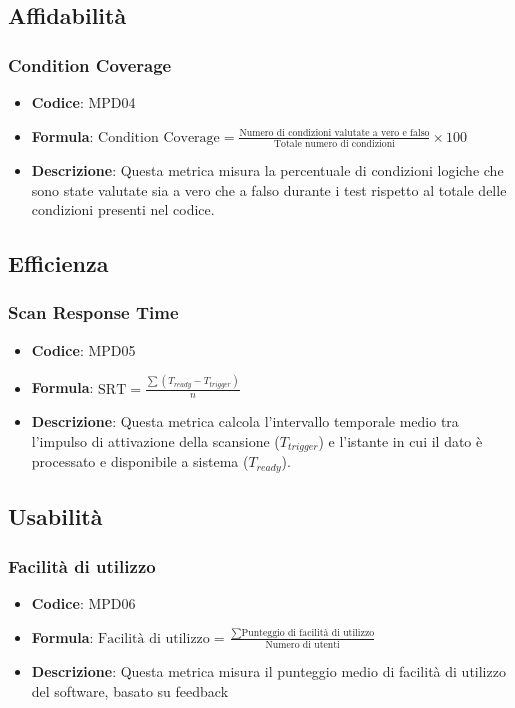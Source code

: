 \documentclass[a4paper, 11pt]{article}
\begin{document}
\subsection{Affidabilità}
\subsubsection{Condition Coverage}
\begin{itemize}
    \item \textbf{Codice}: MPD04
    \item \textbf{Formula}: $\displaystyle \text{Condition Coverage} = \frac{\text{Numero di condizioni valutate a vero e falso}}{\text{Totale numero di condizioni}} \times 100$
    \item \textbf{Descrizione}: Questa metrica misura la percentuale di condizioni logiche che sono state valutate sia a vero che a falso durante i test rispetto al totale delle condizioni presenti nel codice.
\end{itemize}

\subsection{Efficienza}
\subsubsection{Scan Response Time}
\begin{itemize}
    \item \textbf{Codice}: MPD05
    \item \textbf{Formula}: $\displaystyle \text{SRT} = \frac{\sum (T_{ready} - T_{trigger})}{n}$
    \item \textbf{Descrizione}: Questa metrica calcola l'intervallo temporale medio tra l'impulso di attivazione della scansione ($T_{trigger}$) e l'istante in cui il dato è processato e disponibile a sistema ($T_{ready}$).
\end{itemize}

\subsection{Usabilità}
\subsubsection{Facilità di utilizzo}
\begin{itemize}
    \item \textbf{Codice}: MPD06
    \item \textbf{Formula}: $\displaystyle \text{Facilità di utilizzo} = \frac{\sum \text{Punteggio di facilità di utilizzo}}{\text{Numero di utenti}}$
    \item \textbf{Descrizione}: Questa metrica misura il punteggio medio di facilità di utilizzo del software, basato su feedback
\end{itemize}
\end{document}
